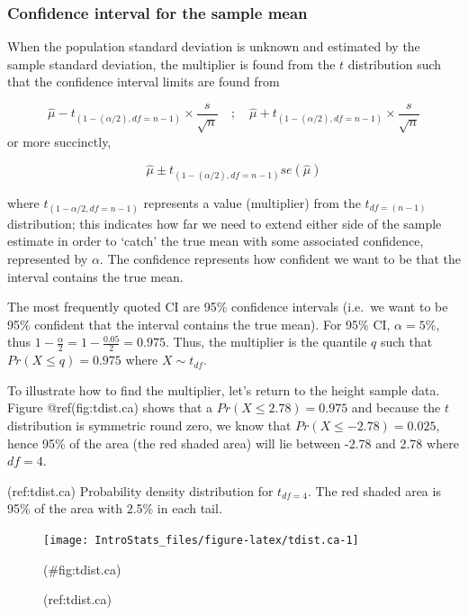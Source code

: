 \documentclass[
  oneside]{krantz}
\begin{document}
\hypertarget{confidence-interval-for-the-sample-mean}{%
\subsubsection{Confidence interval for the sample mean}\label{confidence-interval-for-the-sample-mean}}

When the population standard deviation is unknown and estimated by the sample standard deviation, the multiplier is found from the \(t\) distribution such that the confidence interval limits are found from

\[\hat{\mu} - t_{(1-(\alpha/2), df=n-1)} \times \frac{s}{\sqrt{n}} \quad;\quad \hat{\mu} + t_{(1-(\alpha/2), df=n-1)} \times \frac{s}{\sqrt{n}}\]
or more succinctly,

\[\hat{\mu}\pm t_{(1-(\alpha/2), df=n-1)}se(\hat{\mu})\]

where \(t_{(1-\alpha/2, df=n-1)}\) represents a value (multiplier) from the \(t_{df=(n-1)}\) distribution; this indicates how far we need to extend either side of the sample estimate in order to `catch' the true mean with some associated confidence, represented by \(\alpha\). The confidence represents how confident we want to be that the interval contains the true mean.

The most frequently quoted CI are 95\% confidence intervals (i.e.~we want to be 95\% confident that the interval contains the true mean). For 95\% CI, \(\alpha = 5\)\%, thus \(1 - \frac{\alpha}{2} = 1 - \frac{0.05}{2} = 0.975\). Thus, the multiplier is the quantile \(q\) such that \(Pr(X \le q) = 0.975\) where \(X \sim t_{{df}}\).

To illustrate how to find the multiplier, let's return to the height sample data. Figure @ref(fig:tdist.ca) shows that a \(Pr(X \le 2.78) = 0.975\) and because the \(t\) distribution is symmetric round zero, we know that \(Pr(X \le -2.78) = 0.025\), hence 95\% of the area (the red shaded area) will lie between -2.78 and 2.78 where \(df=4\).

(ref:tdist.ca) Probability density distribution for \(t_{df=4}\). The red shaded area is 95\% of the area with 2.5\% in each tail.

\begin{figure}[!htb]

{\centering \texttt{[image: IntroStats\_files/figure-latex/tdist.ca-1]} 

}

\caption{(ref:tdist.ca)}(\#fig:tdist.ca)
\end{figure}
\end{document}
